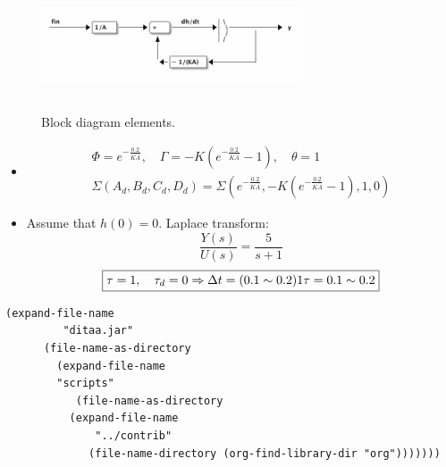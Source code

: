 \documentclass[11pt]{article}
\begin{document}
\begin{figure}[!htpb]
\centering
\includegraphics[width=3in,height=1.5in]{hello.png}
{\caption{Block diagram elements.}}
\end{figure}

\begin{itemize}
\item \[\begin{array}{c}
        \Phi = e^{-\frac{0.2}{K\overline{A}}}, \quad \Gamma = -K\left(e^{-\frac{0.2}{K\overline{A}}} - 1\right), \quad \theta = 1 \\[0.5cm]
        \Sigma(A_{d},B_{d},C_{d},D_{d}) = \Sigma\left( e^{-\frac{0.2}{K\overline{A}}}, -K\left(e^{-\frac{0.2}{K\overline{A}}} - 1\right), 1, 0\right)
        \end{array}\]
\item Assume that \(h(0) = 0\). Laplace transform:
\[ \frac{Y(s)}{U(s)} = \frac{5}{s+1}\]
\[\boxed{ \nonumber  \tau = 1, \quad \tau_{d} = 0\Rightarrow \Delta t = (0.1\sim0.2)1\tau = 0.1\sim 0.2}\]
\end{itemize}

\begin{verbatim}
(expand-file-name
	     "ditaa.jar"
      (file-name-as-directory
	    (expand-file-name
		"scripts"
	       (file-name-as-directory
		  (expand-file-name
		      "../contrib"
		     (file-name-directory (org-find-library-dir "org")))))))
\end{verbatim}
\end{document}
